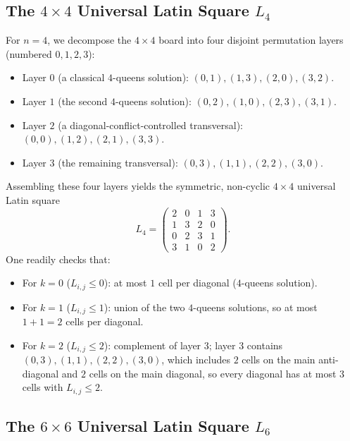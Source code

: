 \documentclass[11pt,a4paper]{article}
\theoremstyle{remark}
\begin{document}
\subsection{The \texorpdfstring{$4 \times 4$}{4x4} Universal Latin Square \texorpdfstring{$L_4$}{L4}}

For $n = 4$, we decompose the $4 \times 4$ board into four disjoint permutation layers (numbered $0, 1, 2, 3$):
\begin{itemize}[nosep]
  \item Layer $0$ (a classical $4$-queens solution): $(0,1), (1,3), (2,0), (3,2)$.
  \item Layer $1$ (the second $4$-queens solution): $(0,2), (1,0), (2,3), (3,1)$.
  \item Layer $2$ (a diagonal-conflict-controlled transversal): $(0,0), (1,2), (2,1), (3,3)$.
  \item Layer $3$ (the remaining transversal): $(0,3), (1,1), (2,2), (3,0)$.
\end{itemize}
Assembling these four layers yields the symmetric, non-cyclic $4 \times 4$ universal Latin square
\[
  L_4 = \begin{pmatrix}
    2 & 0 & 1 & 3 \\
    1 & 3 & 2 & 0 \\
    0 & 2 & 3 & 1 \\
    3 & 1 & 0 & 2
  \end{pmatrix}.
\]
One readily checks that:
\begin{itemize}[nosep]
  \item For $k = 0$ ($L_{i,j} \le 0$): at most $1$ cell per diagonal ($4$-queens solution).
  \item For $k = 1$ ($L_{i,j} \le 1$): union of the two $4$-queens solutions, so at most $1 + 1 = 2$ cells per diagonal.
  \item For $k = 2$ ($L_{i,j} \le 2$): complement of layer $3$; layer $3$ contains $(0,3), (1,1), (2,2), (3,0)$, which includes $2$ cells on the main anti-diagonal and $2$ cells on the main diagonal, so every diagonal has at most $3$ cells with $L_{i,j} \le 2$.
\end{itemize}

\subsection{The \texorpdfstring{$6 \times 6$}{6x6} Universal Latin Square \texorpdfstring{$L_6$}{L6}}
\end{document}
